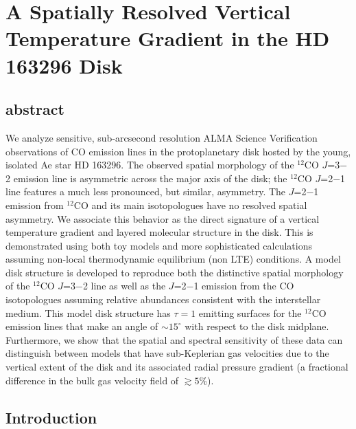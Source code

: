 
\chapter{A Spatially Resolved Vertical Temperature Gradient in the HD 163296 Disk}\label{chap:hd163296}

\section*{abstract}
We analyze sensitive, sub-arcsecond resolution ALMA Science Verification 
observations of CO emission lines in the protoplanetary disk hosted by the 
young, isolated Ae star HD 163296.  The observed spatial morphology of the 
$^{12}$CO $J$=3$-$2 emission line is asymmetric across the major axis of the 
disk; the $^{12}$CO $J$=2$-$1 line features a much less pronounced, but similar,
asymmetry.  The $J$=2$-$1 emission from $^{12}$CO and its main isotopologues 
have no resolved spatial asymmetry.  We associate this behavior as the direct 
signature of a vertical temperature gradient and layered molecular structure in 
the disk.  This is demonstrated using both toy models and more sophisticated 
calculations assuming non-local thermodynamic equilibrium (non LTE) conditions. 
A model disk structure is developed to reproduce both the distinctive spatial 
morphology of the $^{12}$CO $J$=3$-$2 line as well as the $J$=2$-$1 emission 
from the CO isotopologues assuming relative abundances consistent with the 
interstellar medium.  This model disk structure has $\tau=1$ emitting surfaces 
for the $^{12}$CO emission lines that make an angle of $\sim 15^\circ$ with 
respect to the disk midplane.  Furthermore, we show that the spatial and 
spectral 
sensitivity of these data can distinguish between models that have 
sub-Keplerian gas velocities due to the vertical extent of the disk and its 
associated radial pressure gradient (a fractional difference in the bulk gas 
velocity field of $\gtrsim 5$\%).


\section{Introduction}

